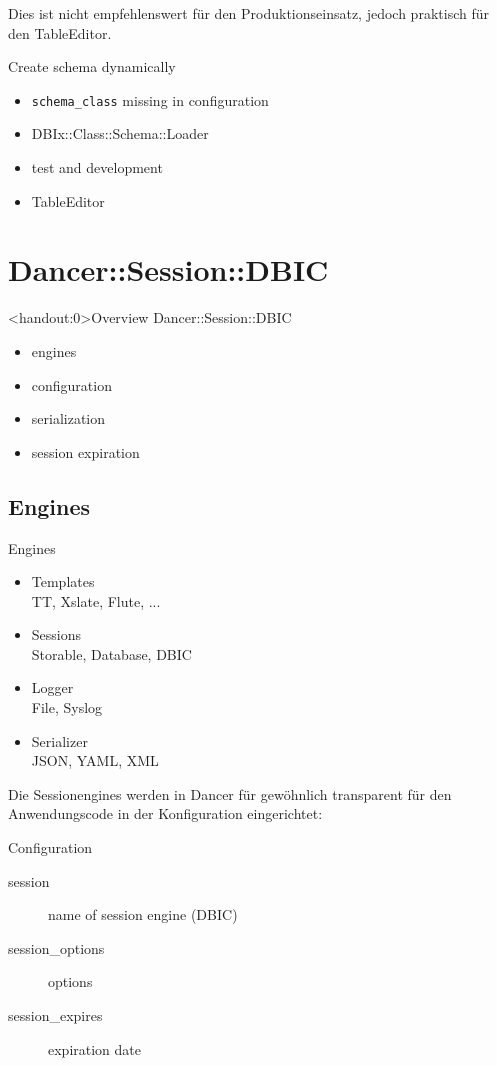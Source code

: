 Dies ist nicht empfehlenswert für den Produktionseinsatz, jedoch
praktisch für den TableEditor.

\begin{frame}[fragile]{Create schema dynamically}
\begin{itemize}
\item \verb|schema_class| missing in configuration
\item DBIx::Class::Schema::Loader
\item test and development
\item TableEditor
\end{itemize}
\end{frame}

\section{Dancer::Session::DBIC}

\begin{frame}<handout:0>{Overview Dancer::Session::DBIC}
\begin{itemize}
\item engines
\item configuration
\item serialization
\item session expiration
\end{itemize}
\end{frame}

\subsection{Engines}
\begin{frame}{Engines}
\begin{itemize}
\item Templates \\
TT, Xslate, Flute, ...
\item Sessions \\ 
Storable, Database, DBIC
\item Logger \\
File, Syslog
\item Serializer  \\
JSON, YAML, XML
\end{itemize}
\end{frame}

Die Sessionengines werden in Dancer für gewöhnlich transparent
für den Anwendungscode in der Konfiguration eingerichtet:

\begin{frame}{Configuration}
\begin{description}
\item[session] name of session engine (DBIC)
\item[session\_options] options
\item[session\_expires] expiration date
\end{description}
\end{frame}

